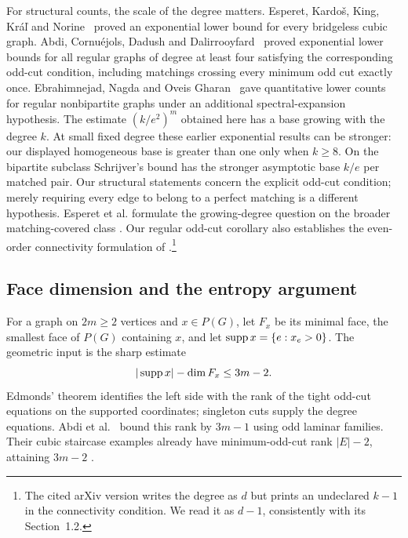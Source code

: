 For structural counts, the scale of the degree matters. Esperet,
Kardo\v{s}, King, Kr\'a\v{l} and Norine~\citep{EsperetEtAl2011}
proved an exponential lower bound for every bridgeless cubic graph.
Abdi, Cornu\'ejols, Dadush and Dalirrooyfard~\citep[Corollary~6.6]{AbdiCornuejolsDadushDalirrooyfard2026}
proved exponential lower bounds for all regular graphs of degree at
least four satisfying the corresponding odd-cut condition, including
matchings crossing every minimum odd cut exactly once.
Ebrahimnejad, Nagda and Oveis Gharan~\citep{EbrahimnejadEtAl2021}
gave quantitative lower counts for regular nonbipartite graphs under
an additional spectral-expansion hypothesis. The estimate
$(k/e^2)^m$ obtained here has a base growing with the degree $k$.
At small fixed degree these earlier exponential results can be
stronger: our displayed homogeneous base is greater than one only
when $k\ge8$. On the bipartite subclass Schrijver's bound has the
stronger asymptotic base $k/e$ per matched pair. Our structural
statements concern the explicit odd-cut condition; merely requiring
every edge to belong to a perfect matching is a different hypothesis.
Esperet et al. formulate the growing-degree question on the broader
matching-covered class \citep[corrected full version, Conjecture~24]{EsperetEtAl2011}.
Our regular odd-cut corollary also establishes the even-order connectivity
formulation of \citet[arXiv version, Conjecture~1.1]{EbrahimnejadEtAl2021}.\footnote{The
cited arXiv version writes the degree as $d$ but prints an undeclared
$k-1$ in the connectivity condition. We read it as $d-1$, consistently
with its Section~1.2.}

\subsection{Face dimension and the entropy argument}

For a graph on $2m\ge2$ vertices and $x\in P(G)$, let $F_x$ be its
minimal face, the smallest face of
$P(G)$ containing $x$, and let $\operatorname{supp} x=\{e:x_e>0\}$.
The geometric input is the sharp estimate
\[
                  |\operatorname{supp} x|-\dim F_x\le3m-2.
\]
Edmonds' theorem identifies the left side with the rank of the tight
odd-cut equations on the supported coordinates; singleton cuts supply
the degree equations. Abdi et al.~\citep[Lemmas~6.4--6.5]{AbdiCornuejolsDadushDalirrooyfard2026}
bound this rank by $3m-1$ using odd laminar families.
Their cubic staircase examples already have minimum-odd-cut rank
$|E|-2$, attaining $3m-2$
\citep[discussion after Corollary~6.6 and Figure~2]{AbdiCornuejolsDadushDalirrooyfard2026}.

